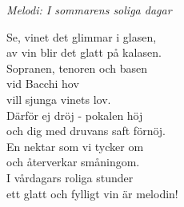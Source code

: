 {\footnotesize\textit{Melodi: I sommarens soliga dagar}}\par
\vspace{10pt}
Se, vinet det glimmar i glasen,\\
av vin blir det glatt på kalasen.\\
Sopranen, tenoren och basen\\
vid Bacchi hov\\
vill sjunga vinets lov.\\
Därför ej dröj - pokalen höj\\
och dig med druvans saft förnöj.\\
En nektar som vi tycker om\\
och återverkar småningom.\\
I vårdagars roliga stunder\\
ett glatt och fylligt vin är melodin!

